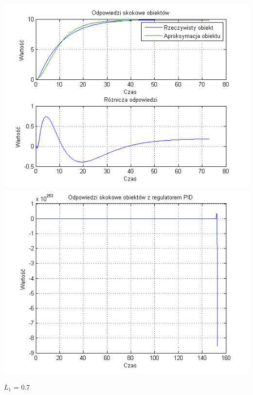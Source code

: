 \documentclass[10pt,a4paper]{article}
\begin{document}
\begin{center}
\includegraphics[scale=1]{images/dwa/skrypt_217.png}\\
\includegraphics[scale=1]{images/dwa/skrypt_218.png}\\
\end{center}
\newpage
$L_1$ = 0.7
\end{document}
